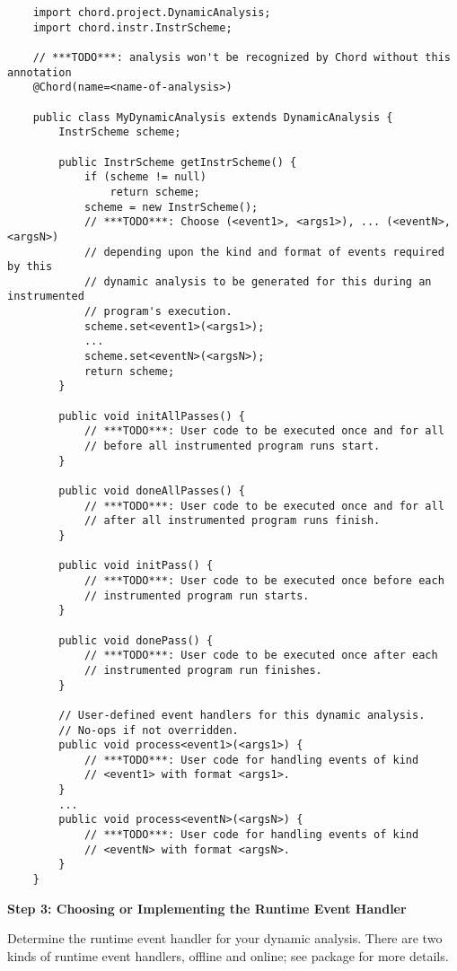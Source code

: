 \begin{verbatim}
    import chord.project.DynamicAnalysis;
    import chord.instr.InstrScheme;

    // ***TODO***: analysis won't be recognized by Chord without this annotation
    @Chord(name=<name-of-analysis>)    
    
    public class MyDynamicAnalysis extends DynamicAnalysis {
        InstrScheme scheme;

        public InstrScheme getInstrScheme() {
            if (scheme != null)
                return scheme;
            scheme = new InstrScheme();
            // ***TODO***: Choose (<event1>, <args1>), ... (<eventN>, <argsN>)
            // depending upon the kind and format of events required by this
            // dynamic analysis to be generated for this during an instrumented
            // program's execution.
            scheme.set<event1>(<args1>);
            ...
            scheme.set<eventN>(<argsN>);
            return scheme;
        }

        public void initAllPasses() {
            // ***TODO***: User code to be executed once and for all
            // before all instrumented program runs start.
        }

        public void doneAllPasses() {
            // ***TODO***: User code to be executed once and for all
            // after all instrumented program runs finish.
        }

        public void initPass() {
            // ***TODO***: User code to be executed once before each
            // instrumented program run starts.
        }

        public void donePass() {
            // ***TODO***: User code to be executed once after each
            // instrumented program run finishes.
        }

        // User-defined event handlers for this dynamic analysis.
        // No-ops if not overridden.
        public void process<event1>(<args1>) {
            // ***TODO***: User code for handling events of kind
            // <event1> with format <args1>.
        }
        ...
        public void process<eventN>(<argsN>) {
            // ***TODO***: User code for handling events of kind
            // <eventN> with format <argsN>.
        }
    }
\end{verbatim}

{\bf Step 3: Choosing or Implementing the Runtime Event Handler}

Determine the runtime event handler for your dynamic analysis. There are two kinds of runtime event
handlers, offline and online; see package  for more details.

